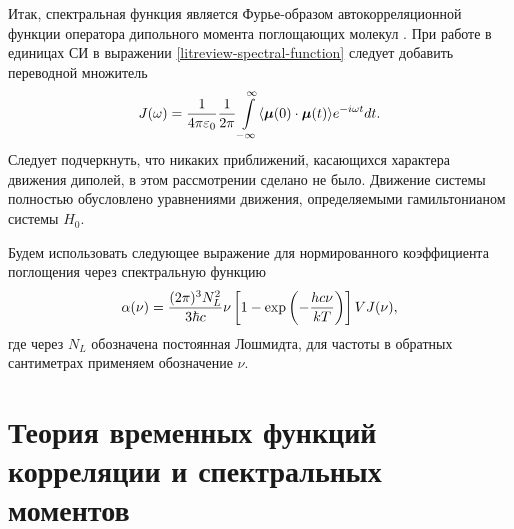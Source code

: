 Итак, спектральная функция является Фурье-образом автокорреляционной функции оператора дипольного момента поглощающих молекул \cite{gordon1968}. При работе в единицах СИ в выражении \eqref{litreview-spectral-function} следует добавить переводной множитель
\begin{gather}
    J(\omega) = \frac{1}{4\pi \varepsilon_0} \frac{1}{2\pi} \int\limits_{-\infty}^\infty \langle  \boldsymbol{\mu}(0) \cdot \boldsymbol{\mu}(t)  \rangle e^{-i \omega t} dt. \label{litreview-spectral-function} 
\end{gather}
Следует подчеркнуть, что никаких приближений, касающихся характера движения диполей, в этом рассмотрении сделано не было. Движение системы полностью обусловлено уравнениями движения, определяемыми гамильтонианом системы $\hat{H}_0$. \par
Будем использовать следующее выражение для нормированного коэффициента поглощения через спектральную функцию 
\begin{gather}
    \alpha(\nu) = \frac{(2 \pi)^3 N_L^2}{3 \hbar c} \nu \left[ 1 - \exp \left( -\frac{h c \nu}{k T} \right) \right] V J(\nu), \label{part1-absorption-coefficient-definition1}  
\end{gather}
%
где через $N_L$ обозначена постоянная Лошмидта, для частоты в обратных сантиметрах применяем обозначение $\nu$. 

\section{Теория временных функций корреляции и спектральных моментов} \label{section:correlation_functions}

